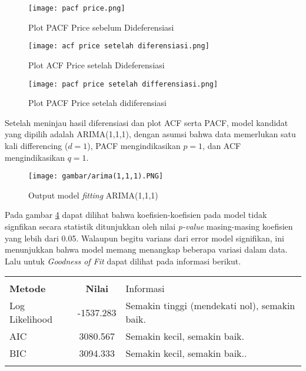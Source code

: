 \documentclass[a4paper,12pt]{article}
\begin{document}
\begin{figure}[H]
    \centering
    \texttt{[image: pacf price.png]}
    \caption{Plot PACF Price sebelum Dideferensiasi}
    \label{fig:pacf}
\end{figure}

\begin{figure}[H]
    \centering
    \texttt{[image: acf price setelah diferensiasi.png]}
    \caption{Plot ACF Price setelah Dideferensiasi}
    \label{fig:acf}
\end{figure}

\begin{figure}[H]
    \centering
    \texttt{[image: pacf price setelah differensiasi.png]}
    \caption{Plot PACF Price setelah didiferensiasi}
    \label{fig:enter-label}
\end{figure}

Setelah meninjau hasil diferensiasi dan plot ACF serta PACF, model kandidat yang dipilih adalah ARIMA(1,1,1), dengan asumsi bahwa data memerlukan satu kali differencing ($d=1$), PACF mengindikasikan $p=1$, dan ACF mengindikasikan $q=1$.

\begin{figure}[htb!]
    \centering
    \texttt{[image: gambar/arima(1,1,1).PNG]}
    \caption{Output model \textit{fitting} ARIMA(1,1,1)}
    \label{fig:arima111}
\end{figure}

Pada gambar \ref{fig:arima111} dapat dilihat bahwa koefisien-koefisien pada model tidak signfikan secara statistik ditunjukkan oleh nilai \textit{p-value} masing-masing koefisien yang lebih dari 0.05. Walaupun begitu varians dari error model signifikan, ini menunjukkan bahwa model memang menangkap beberapa variasi dalam data. Lalu untuk \textit{Goodness of Fit} dapat dilihat pada informasi berikut.

\begin{tabular}{l c l}
    &&\\
    \textbf{Metode} & \textbf{Nilai} & Informasi \\ \hline
    Log Likelihood &  -1537.283 & Semakin tinggi (mendekati nol), semakin baik.\\
    AIC &  3080.567 & Semakin kecil, semakin baik.\\
    BIC &  3094.333 & Semakin kecil, semakin baik..\\
    &&
\end{tabular}
\end{document}
